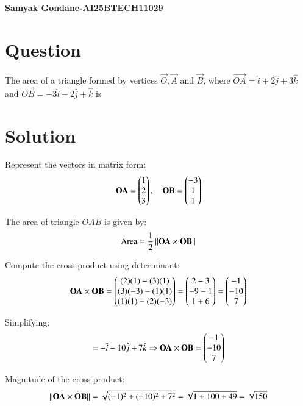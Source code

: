 \documentclass{article}
\begin{document}
\begin{center}
\large
    \textbf{Samyak Gondane-AI25BTECH11029}
\end{center}
\date{}

\section*{Question}
The area of a triangle formed by vertices $\vec{O}, \vec{A}$ and $\vec{B}$, where $\vec{OA} = \hat{i} + 2\hat{j} + 3\hat{k}$ and $\vec{OB} = -3\hat{i} - 2\hat{j} + \hat{k}$ is


\section*{Solution}

Represent the vectors in matrix form:
\begin{align}
\mathbf{OA} = \begin{pmatrix}1 \\ 2 \\ 3\end{pmatrix}, \quad
\mathbf{OB} = \begin{pmatrix}-3 \\ 1 \\ 1\end{pmatrix}
\end{align}

The area of triangle $OAB$ is given by:
\begin{align}
\text{Area} = \frac{1}{2} \left\lVert\mathbf{OA} \times \mathbf{OB}\right\rVert
\end{align}

Compute the cross product using determinant:
\begin{align}
\mathbf{OA} \times \mathbf{OB} =
\begin{pmatrix}
(2)(1) - (3)(1) \\
(3)(-3) - (1)(1) \\
(1)(1) - (2)(-3)
\end{pmatrix}
=
\begin{pmatrix}
2 - 3 \\
-9 - 1 \\
1 + 6
\end{pmatrix}
=
\begin{pmatrix}
-1 \\
-10 \\
7
\end{pmatrix}
\end{align}

Simplifying:
\begin{align}
= -\hat{i} - 10\hat{j} + 7\hat{k}
\Rightarrow \mathbf{OA} \times \mathbf{OB} = \begin{pmatrix}-1 \\ -10 \\ 7\end{pmatrix}
\end{align}

Magnitude of the cross product:
\begin{align}
\left\lVert\mathbf{OA} \times \mathbf{OB}\right\rVert = \sqrt{(-1)^2 + (-10)^2 + 7^2} = \sqrt{1 + 100 + 49} = \sqrt{150}
\end{align}
\end{document}
